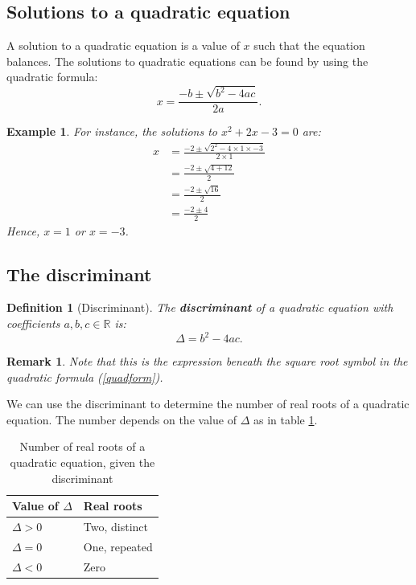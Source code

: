 \documentclass[12pt,a4paper]{article}
\renewcommand{\emph}{\textbf}
\theoremstyle{clearprint}
\newtheorem*{example*}{Example}
\newtheorem*{definition*}{Definition}
\newtheorem*{remark*}{Remark}
\begin{document}
\subsection{Solutions to a quadratic equation}

A solution to a quadratic equation is a value of \(x\) such that the equation balances. The solutions to quadratic equations can be found by using the quadratic formula: 
\begin{equation}
\label{quadform}
x = \frac{-b \pm \sqrt{b^2-4ac}}{2a}.
\end{equation}

\begin{example*}
For instance, the solutions to \(x^2 + 2x -3 = 0\) are:
\begin{align*}
x &= \frac{-2 \pm \sqrt{2^2-4\times 1 \times -3}}{2 \times 1}\\
&= \frac{-2 \pm \sqrt{4+12}}{2}\\
&= \frac{-2 \pm \sqrt{16}}{2}\\
&= \frac{-2 \pm 4}{2}
\end{align*} 
Hence, \(x = 1\) or \(x = -3\).  
\end{example*}

\subsection{The discriminant}

\begin{definition*}[Discriminant]
The \emph{discriminant} of a quadratic equation with coefficients \(a, b, c \in \mathbb{R}\) is:
\[
\Delta = b^2 - 4ac.
\]
\end{definition*}

\begin{remark*}
Note that this is the expression beneath the square root symbol in the quadratic formula (\ref{quadform}).
\end{remark*}

We can use the discriminant to determine the number of real roots of a quadratic equation. The number depends on the value of \(\Delta\) as in table \ref{Distable}.
\begin{table}[!h]
\begin{center}
\begin{tabular}{|l|l|}
\hline
Value of \(\Delta\) & Real roots \\
\hline
\(\Delta > 0\) & Two, distinct\\
\(\Delta = 0\) & One, repeated\\
\(\Delta < 0\) & Zero\\
\hline
\end{tabular}
\end{center}
\caption{Number of real roots of a quadratic equation, given the discriminant}
\label{Distable}
\end{table}
\end{document}
